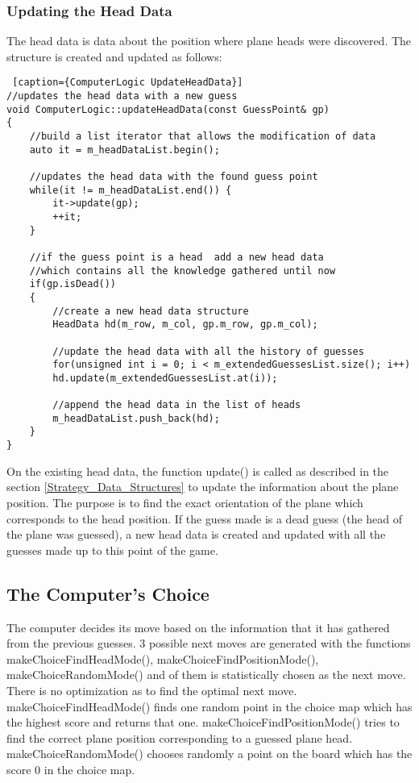 \subsubsection {Updating the Head Data}

The head data is data about the position where plane heads were discovered. The structure is created and updated as follows:

\begin{lstlisting} [caption={ComputerLogic UpdateHeadData}]
//updates the head data with a new guess
void ComputerLogic::updateHeadData(const GuessPoint& gp)
{
	//build a list iterator that allows the modification of data
	auto it = m_headDataList.begin();
	
	//updates the head data with the found guess point
	while(it != m_headDataList.end()) {
		it->update(gp);
		++it;
	}
	
	//if the guess point is a head  add a new head data
	//which contains all the knowledge gathered until now
	if(gp.isDead())
	{
		//create a new head data structure
		HeadData hd(m_row, m_col, gp.m_row, gp.m_col);
		
		//update the head data with all the history of guesses
		for(unsigned int i = 0; i < m_extendedGuessesList.size(); i++)
		hd.update(m_extendedGuessesList.at(i));
		
		//append the head data in the list of heads
		m_headDataList.push_back(hd);
	}
}
\end{lstlisting}

On the existing head data, the function update() is called as described in the section \ref{Strategy_Data_Structures} to update the information about the plane position. The purpose is to find the exact orientation of the plane which corresponds to the head position. If the guess made is a dead guess (the head of the plane was guessed), a new head data is created and updated with all the guesses made up to this point of the game.

\subsection {The Computer's Choice}

The computer decides its move based on the information that it has gathered from the previous guesses. 3 possible next moves are generated with the functions makeChoiceFindHeadMode(),  makeChoiceFindPositionMode(),  makeChoiceRandomMode() and of them is statistically chosen as the next move. There is no optimization as to find the optimal next move. makeChoiceFindHeadMode() finds one random point in the choice map which has the highest score and returns that one. makeChoiceFindPositionMode() tries to find the correct plane position corresponding to a guessed plane head. makeChoiceRandomMode() chooses randomly a point on the board which has the score 0 in the choice map.

